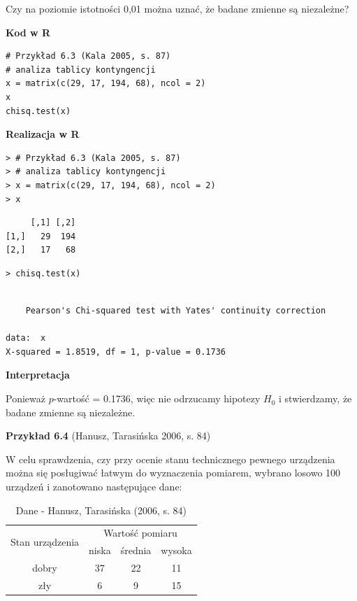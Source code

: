 \documentclass[12pt,B5paper,]{book}
\begin{document}
Czy na poziomie istotności 0,01 można uznać, że badane zmienne są
niezależne?

\vspace{0.8cm} \textbf{Kod w R}

\begin{verbatim}
# Przykład 6.3 (Kala 2005, s. 87)
# analiza tablicy kontyngencji
x = matrix(c(29, 17, 194, 68), ncol = 2)
x
chisq.test(x)
\end{verbatim}

\vspace{0.8cm} \textbf{Realizacja w R}

\begin{verbatim}
> # Przykład 6.3 (Kala 2005, s. 87)
> # analiza tablicy kontyngencji
> x = matrix(c(29, 17, 194, 68), ncol = 2)
> x
\end{verbatim}

\begin{verbatim}
     [,1] [,2]
[1,]   29  194
[2,]   17   68
\end{verbatim}

\begin{verbatim}
> chisq.test(x)
\end{verbatim}

\begin{verbatim}

    Pearson's Chi-squared test with Yates' continuity correction

data:  x
X-squared = 1.8519, df = 1, p-value = 0.1736
\end{verbatim}

\vspace{0.8cm} \textbf{Interpretacja}

Ponieważ \(p\)-wartość = 0.1736, więc nie odrzucamy hipotezy \(H_0\) i
stwierdzamy, że badane zmienne są niezależne.

\vspace{0.8cm} \textbf{Przykład 6.4} (Hanusz, Tarasińska 2006, s. 84)

W celu sprawdzenia, czy przy ocenie stanu technicznego pewnego
urządzenia można się posługiwać łatwym do wyznaczenia pomiarem, wybrano
losowo 100 urządzeń i zanotowano następujące dane:

\begin{table}[H]
\centering
\caption{Dane - Hanusz, Tarasińska (2006, s. 84)}
\label{hanusz}
\begin{tabular}{cccc}
\hline
\multirow{2}{*}{Stan urządzenia} &  \multicolumn{3}{c}{Wartość pomiaru} \\
 & niska     & średnia     & wysoka    \\ \hline
dobry        & 37        & 22          & 11 \\
zły         & 6         & 9           & 15   \\ \hline    
\end{tabular}
\end{table}
\end{document}
